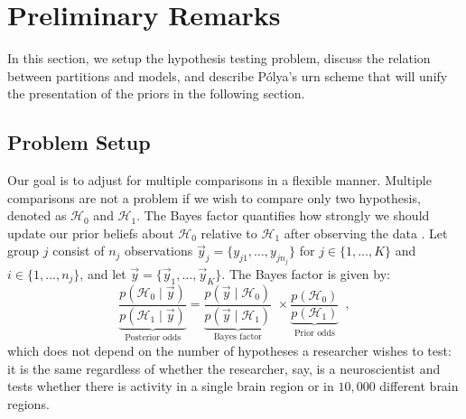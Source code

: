 \documentclass[11pt,a4paper]{article}
\theoremstyle{definition} %
\theoremstyle{case}
\begin{document}



\section{Preliminary Remarks} \label{sec:setup}
In this section, we setup the hypothesis testing problem, discuss the relation between partitions and models, and describe P\'{o}lya's urn scheme that will unify the presentation of the priors in the following section. 

\subsection{Problem Setup}
Our goal is to adjust for multiple comparisons in a flexible manner. Multiple comparisons are not a problem if we wish to compare only two hypothesis, denoted as $\mathcal{H}_0$ and $\mathcal{H}_1$. The Bayes factor quantifies how strongly we should update our prior beliefs about $\mathcal{H}_0$ relative to $\mathcal{H}_1$ after observing the data \parencite{kass1995bayes, ly2016harold}. Let group $j$ consist of $n_j$ observations $\vec{y}_j = \{y_{j1}, \ldots, y_{jn_j}\}$ for $j \in \{1, \ldots, K\}$ and $i \in \{1, \ldots, n_j\}$, and let $\vec{y} = \{\vec{y}_1, \ldots ,\vec{y}_K\}$. The Bayes factor is given by:
\begin{equation}
    \underbrace{\frac{p(\mathcal{H}_0 \mid \vec{y})}{p(\mathcal{H}_1 \mid \vec{y})}}_{\text{Posterior odds}} = \underbrace{\frac{p(\vec{y} \mid \mathcal{H}_0)}{p(\vec{y} \mid \mathcal{H}_1)}}_{\text{Bayes factor}} \, \, \times \underbrace{\frac{p(\mathcal{H}_0)}{p(\mathcal{H}_1)}}_{\text{Prior odds}} \enspace ,
\end{equation}
which does not depend on the number of hypotheses a researcher wishes to test: it is the same regardless of whether the researcher, say, is a neuroscientist and tests whether there is activity in a single brain region or in $10,000$ different brain regions.
\end{document}
